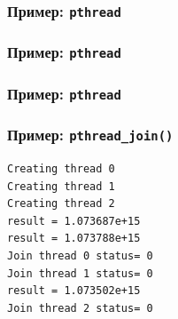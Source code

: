 \documentclass[ignorenonframetext, hyperref=unicode]{beamer}
\begin{document}
\begin{frame}[containsverbatim]
\frametitle{Пример: \lstinline{pthread}}

\end{frame}


\begin{frame}[containsverbatim]
\frametitle{Пример: \lstinline{pthread}}

\end{frame}

\begin{frame}[containsverbatim]
\frametitle{Пример: \lstinline{pthread}}

\end{frame}

\begin{frame}[containsverbatim]
\frametitle{Пример: \lstinline{pthread_join()}}
\begin{verbatim}
Creating thread 0
Creating thread 1
Creating thread 2
result = 1.073687e+15
result = 1.073788e+15
Join thread 0 status= 0
Join thread 1 status= 0
result = 1.073502e+15
Join thread 2 status= 0
\end{verbatim}
\end{frame}
\end{document}
